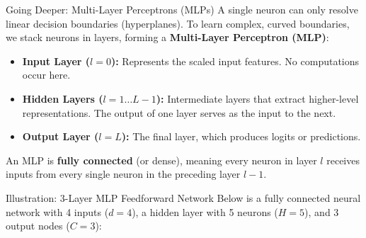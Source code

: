 \documentclass[9pt]{beamer}
\begin{document}
\begin{frame}{Going Deeper: Multi-Layer Perceptrons (MLPs)}
  A single neuron can only resolve linear decision boundaries (hyperplanes). To learn complex, curved boundaries, we stack neurons in layers, forming a \textbf{Multi-Layer Perceptron (MLP)}:
  \begin{itemize}
    \item \textbf{Input Layer ($l=0$):} Represents the scaled input features. No computations occur here.
    \item \textbf{Hidden Layers ($l = 1 \dots L-1$):} Intermediate layers that extract higher-level representations. The output of one layer serves as the input to the next.
    \item \textbf{Output Layer ($l=L$):} The final layer, which produces logits or predictions.
  \end{itemize}
  An MLP is \textbf{fully connected} (or dense), meaning every neuron in layer $l$ receives inputs from every single neuron in the preceding layer $l-1$.
\end{frame}

\begin{frame}{Illustration: 3-Layer MLP Feedforward Network}
  Below is a fully connected neural network with 4 inputs ($d=4$), a hidden layer with 5 neurons ($H=5$), and 3 output nodes ($C=3$):
  \vfill
  \centering
  \vfill
\end{frame}
\end{document}
